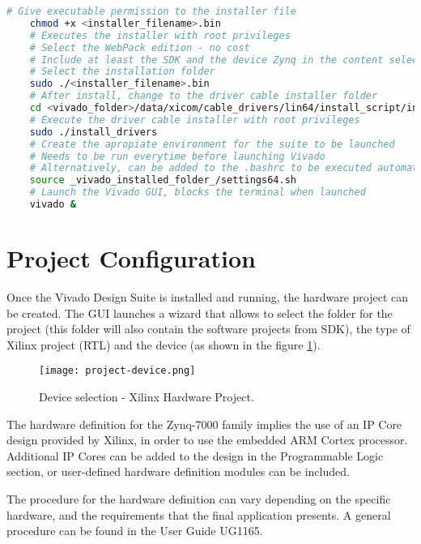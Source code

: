 \begin{lstlisting}[language=bash, basicstyle=\scriptsize\ttfamily, tabsize=2, commentstyle=\color{darkgray}, keywordstyle=\color{blue}, backgroundcolor=\color{lightgray}, morekeywords={chmod, sudo}, breaklines=true]
	# Give executable permission to the installer file
	chmod +x <installer_filename>.bin
	# Executes the installer with root privileges
	# Select the WebPack edition - no cost
	# Include at least the SDK and the device Zynq in the content selection
	# Select the installation folder
	sudo ./<installer_filename>.bin
	# After install, change to the driver cable installer folder
	cd <vivado_folder>/data/xicom/cable_drivers/lin64/install_script/install_drivers/
	# Execute the driver cable installer with root privileges
	sudo ./install_drivers
	# Create the apropiate environment for the suite to be launched
	# Needs to be run everytime before launching Vivado
	# Alternatively, can be added to the .bashrc to be executed automatically
	source _vivado_installed_folder_/settings64.sh
	# Launch the Vivado GUI, blocks the terminal when launched
	vivado &
\end{lstlisting}

\section{Project Configuration}

Once the Vivado Design Suite is installed and running, the hardware project can be created. The GUI launches a wizard that allows to select the folder for the project (this folder will also contain the software projects from SDK), the type of Xilinx project (RTL) and the device (as shown in the figure \ref{fig:device-vivado}).

\begin{figure}[h!]
	\centering
	\texttt{[image: project-device.png]}
	\caption{Device selection - Xilinx Hardware Project.} \label{fig:device-vivado}
\end{figure}

The hardware definition for the Zynq-7000 family implies the use of an IP Core design provided by Xilinx, in order to use the embedded ARM Cortex processor. Additional IP Cores can be added to the design in the Programmable Logic section, or user-defined hardware definition modules can be included.

The procedure for the hardware definition can vary depending on the specific hardware, and the requirements that the final application presents. A general procedure can be found in the User Guide UG1165\cite{UG1165}.

